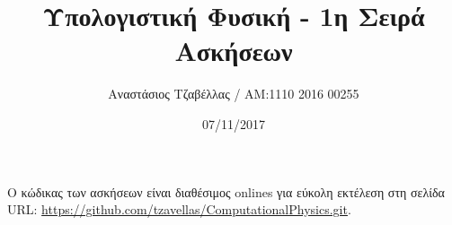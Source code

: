 \documentclass[11pt]{article}
\begin{document}


\title{Υπολογιστική Φυσική - 1η Σειρά Ασκήσεων}
\author{Αναστάσιος Τζαβέλλας / ΑΜ:1110 2016 00255}
\date{07/11/2017}
\maketitle







Ο κώδικας των ασκήσεων είναι διαθέσιμος \textlatin{onlines} για εύκολη εκτέλεση στη σελίδα  URL: \url{https://github.com/tzavellas/ComputationalPhysics.git}.
\end{document}
